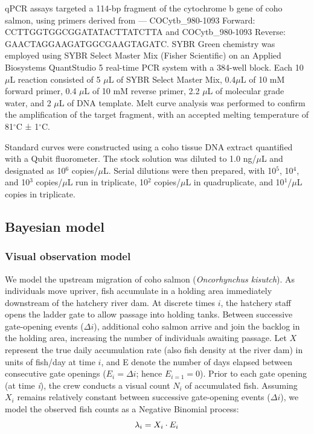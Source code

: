 \documentclass{article}
\begin{document}
qPCR assays targeted a 114-bp fragment of the cytochrome b gene of coho salmon, using primers derived from \cite{duda2021}— COCytb\_980-1093 Forward: CCTTGGTGGCGGATATACTTATCTTA and COCytb\_980-1093 Reverse: GAACTAGGAAGATGGCGAAGTAGATC. SYBR Green chemistry was employed using SYBR Select Master Mix (Fisher Scientific) on an Applied Biosystems QuantStudio 5 real-time PCR system with a 384-well block. Each 10 $\mu$L reaction consisted of 5 $\mu$L of SYBR Select Master Mix, 0.4$\mu$L of 10 mM forward primer, 0.4 $\mu$L of 10 mM reverse primer, 2.2 $\mu$L of molecular grade water, and 2 $\mu$L of DNA template. Melt curve analysis was performed to confirm the amplification of the target fragment, with an accepted melting temperature of 81$^\circ$C ± 1$^\circ$C.

Standard curves were constructed using a coho tissue DNA extract quantified with a Qubit fluorometer. The stock solution was diluted to 1.0 ng/$\mu$L and designated as 10$^6$ copies/$\mu$L. Serial dilutions were then prepared, with 10$^5$, 10$^4$, and 10$^3$ copies/$\mu$L run in triplicate, 10$^2$ copies/$\mu$L in quadruplicate, and 10$^1$/$\mu$L copies in triplicate.


\subsection{Bayesian model}
\subsubsection{Visual observation model}
We model the upstream migration of coho salmon (\textit{Oncorhynchus kisutch}). As individuals move upriver, fish accumulate in a holding area immediately downstream of the hatchery river dam. At discrete times $i$, the hatchery staff opens the ladder gate to allow passage into holding tanks. Between successive gate-opening events ($\Delta i$), additional coho salmon arrive and join the backlog in the holding area, increasing the number of individuals awaiting passage. Let $X$ represent the true daily accumulation rate (also fish density at the river dam) in units of fish/day at time $i$, and E denote the number of days elapsed between consecutive gate openings ($ E_i =\Delta i$; hence $ E_{i=1} = 0$). Prior to each gate opening (at time \textit{i}), the crew conducts a visual count $N_i$ of accumulated fish. Assuming $X_i$ remains relatively constant between successive gate-opening events ($\Delta i$), we model the observed fish counts as a Negative Binomial process:
\begin{equation}
\lambda_i = X_i \cdot E_i \\
\end{equation}
\end{document}
